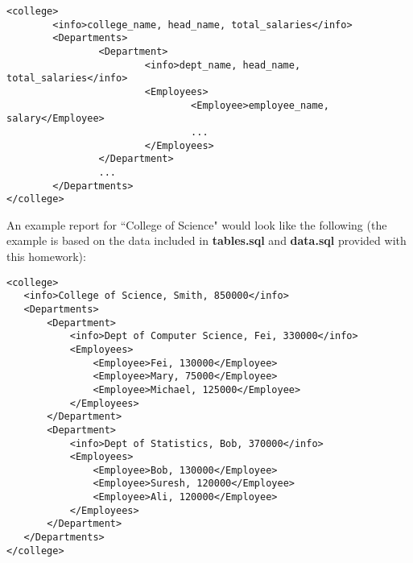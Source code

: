 \begin{questions}
\begin{verbatim}
<college>
        <info>college_name, head_name, total_salaries</info>
        <Departments>
                <Department>
                        <info>dept_name, head_name, total_salaries</info>
                        <Employees>
                                <Employee>employee_name, salary</Employee>
                                ...
                        </Employees>
                </Department>
                ...
        </Departments>
</college>
\end{verbatim}

An example report for ``College of Science" would look like the following (the example is based on the data included in \textbf{tables.sql} and \textbf{data.sql} provided with this homework):

\begin{verbatim}
<college>
   <info>College of Science, Smith, 850000</info>
   <Departments>
       <Department>
           <info>Dept of Computer Science, Fei, 330000</info>
           <Employees>
               <Employee>Fei, 130000</Employee>
               <Employee>Mary, 75000</Employee>
               <Employee>Michael, 125000</Employee>
           </Employees>
       </Department>
       <Department>
           <info>Dept of Statistics, Bob, 370000</info>
           <Employees>
               <Employee>Bob, 130000</Employee>
               <Employee>Suresh, 120000</Employee>
               <Employee>Ali, 120000</Employee>
           </Employees>
       </Department>
   </Departments>
</college>
\end{verbatim}

\end{questions}
\bigskip 
\noindent




